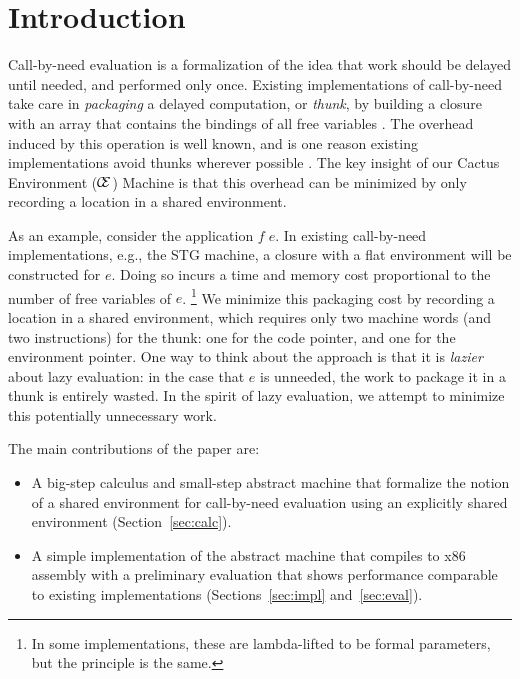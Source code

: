 \section{Introduction}

Call-by-need evaluation is a formalization of the idea that work
should be delayed until needed, and performed only once.  Existing
implementations of call-by-need take care in \emph{packaging} a delayed
computation, or \emph{thunk}, by building a closure with an array that contains
the bindings of all free variables \cite{jonesstg,boquist1997grin}. The overhead
induced by this operation is well known, and is one reason existing implementations
avoid thunks wherever possible \cite{johnsson1984efficient}. The key insight of
our Cactus Environment ($\mathcal{\mathcal{C} \mskip -4mu \mathcal{E}}$) Machine is that this overhead can be
minimized by only recording a location in a shared environment.

As an example, consider the application $f \; e$. In existing call-by-need
implementations, e.g., the STG machine\cite{jonesstg}, a closure with a flat
environment will be constructed for $e$.  Doing so incurs a time and memory cost
proportional to the number of free variables of $e$. \footnote{In some
implementations, these are lambda-lifted to be formal parameters, but the
principle is the same.} We minimize this packaging cost by recording a
location in a shared environment, which requires only two
machine words (and two instructions) for the thunk: one for the code pointer,
and one for the environment pointer. One way to think about the approach is that
it is \emph{lazier} about lazy evaluation: in the case that $e$ is unneeded, the
work to package it in a thunk is entirely wasted. In the spirit of lazy
evaluation, we attempt to minimize this potentially unnecessary work.  

The main contributions of the paper are:
\begin{itemize}
\item A big-step calculus and small-step abstract machine that formalize the
notion of a shared environment for call-by-need evaluation using an explicitly
shared environment (Section~\ref{sec:calc}).
\item A simple implementation of the abstract machine that compiles to x86
assembly with a preliminary evaluation that shows performance comparable to
existing implementations (Sections~\ref{sec:impl} and~\ref{sec:eval}).
\end{itemize}

